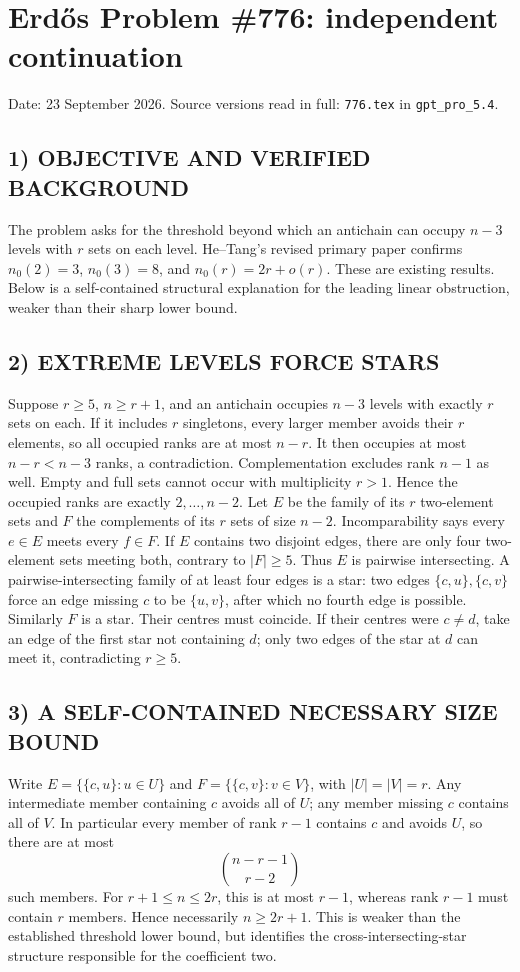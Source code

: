 \section{Erd\H{o}s Problem \#776: independent continuation}
\noindent Date: 23 September 2026. Source versions read in full: \texttt{776.tex} in \texttt{gpt\_pro\_5.4}.

\subsection*{1) OBJECTIVE AND VERIFIED BACKGROUND}
The problem asks for the threshold beyond which an antichain can occupy $n-3$ levels with $r$ sets on each level. He--Tang's revised primary paper confirms $n_0(2)=3$, $n_0(3)=8$, and $n_0(r)=2r+o(r)$. These are existing results. Below is a self-contained structural explanation for the leading linear obstruction, weaker than their sharp lower bound.
\subsection*{2) EXTREME LEVELS FORCE STARS}
Suppose $r\ge5$, $n\ge r+1$, and an antichain occupies $n-3$ levels with exactly $r$ sets on each. If it includes $r$ singletons, every larger member avoids their $r$ elements, so all occupied ranks are at most $n-r$. It then occupies at most $n-r<n-3$ ranks, a contradiction. Complementation excludes rank $n-1$ as well. Empty and full sets cannot occur with multiplicity $r>1$. Hence the occupied ranks are exactly $2,\ldots,n-2$.
Let $E$ be the family of its $r$ two-element sets and $F$ the complements of its $r$ sets of size $n-2$. Incomparability says every $e\in E$ meets every $f\in F$. If $E$ contains two disjoint edges, there are only four two-element sets meeting both, contrary to $|F|\ge5$. Thus $E$ is pairwise intersecting. A pairwise-intersecting family of at least four edges is a star: two edges $\{c,u\},\{c,v\}$ force an edge missing $c$ to be $\{u,v\}$, after which no fourth edge is possible. Similarly $F$ is a star.
Their centres must coincide. If their centres were $c\ne d$, take an edge of the first star not containing $d$; only two edges of the star at $d$ can meet it, contradicting $r\ge5$.
\subsection*{3) A SELF-CONTAINED NECESSARY SIZE BOUND}
Write $E=\{\{c,u\}:u\in U\}$ and $F=\{\{c,v\}:v\in V\}$, with $|U|=|V|=r$. Any intermediate member containing $c$ avoids all of $U$; any member missing $c$ contains all of $V$. In particular every member of rank $r-1$ contains $c$ and avoids $U$, so there are at most
\[
\binom{n-r-1}{r-2}
\]
such members. For $r+1\le n\le2r$, this is at most $r-1$, whereas rank $r-1$ must contain $r$ members. Hence necessarily $n\ge2r+1$.
This is weaker than the established threshold lower bound, but identifies the cross-intersecting-star structure responsible for the coefficient two.

